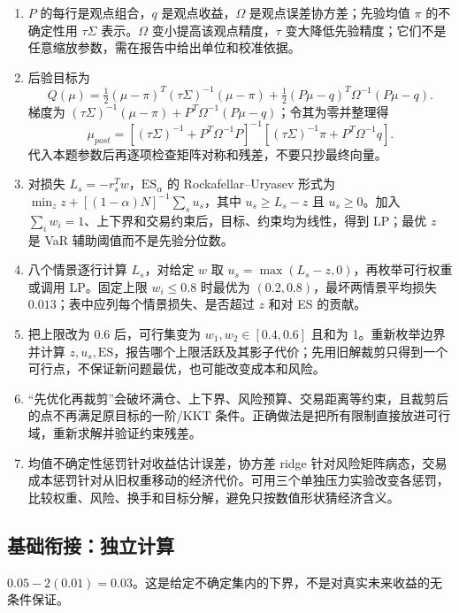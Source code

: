 
\begin{enumerate}[leftmargin=*]
  \item $P$ 的每行是观点组合，$q$ 是观点收益，$\Omega$ 是观点误差协方差；先验均值 $\pi$ 的不确定性用 $\tau\Sigma$ 表示。$\Omega$ 变小提高该观点精度，$\tau$ 变大降低先验精度；它们不是任意缩放参数，需在报告中给出单位和校准依据。
  \item 后验目标为
  \[
  Q(\mu)=\tfrac12(\mu-\pi)^T(\tau\Sigma)^{-1}(\mu-\pi)+
  \tfrac12(P\mu-q)^T\Omega^{-1}(P\mu-q).
  \]
  梯度为 $(\tau\Sigma)^{-1}(\mu-\pi)+P^T\Omega^{-1}(P\mu-q)$；令其为零并整理得
  \[
  \mu_{post}=\left[(\tau\Sigma)^{-1}+P^T\Omega^{-1}P\right]^{-1}
  \left[(\tau\Sigma)^{-1}\pi+P^T\Omega^{-1}q\right].
  \]
  代入本题参数后再逐项检查矩阵对称和残差，不要只抄最终向量。
  \item 对损失 $L_s=-r_s^Tw$，$\mathrm{ES}_\alpha$ 的 Rockafellar--Uryasev 形式为 $\min_z z+[(1-\alpha)N]^{-1}\sum_su_s$，其中 $u_s\ge L_s-z$ 且 $u_s\ge0$。加入 $\sum_iw_i=1$、上下界和交易约束后，目标、约束均为线性，得到 LP；最优 $z$ 是 VaR 辅助阈值而不是先验分位数。
  \item 八个情景逐行计算 $L_s$，对给定 $w$ 取 $u_s=\max(L_s-z,0)$，再枚举可行权重或调用 LP。固定上限 $w_i\le0.8$ 时最优为 $(0.2,0.8)$，最坏两情景平均损失 $0.013$；表中应列每个情景损失、是否超过 $z$ 和对 ES 的贡献。
  \item 把上限改为 $0.6$ 后，可行集变为 $w_1,w_2\in[0.4,0.6]$ 且和为 1。重新枚举边界并计算 $z,u_s,\mathrm{ES}$，报告哪个上限活跃及其影子代价；先用旧解裁剪只得到一个可行点，不保证新问题最优，也可能改变成本和风险。
  \item “先优化再裁剪”会破坏满仓、上下界、风险预算、交易距离等约束，且裁剪后的点不再满足原目标的一阶/KKT 条件。正确做法是把所有限制直接放进可行域，重新求解并验证约束残差。
  \item 均值不确定性惩罚针对收益估计误差，协方差 ridge 针对风险矩阵病态，交易成本惩罚针对从旧权重移动的经济代价。可用三个单独压力实验改变各惩罚，比较权重、风险、换手和目标分解，避免只按数值形状猜经济含义。
\end{enumerate}

\subsection*{基础衔接：独立计算}
$0.05-2(0.01)=0.03$。这是给定不确定集内的下界，不是对真实未来收益的无条件保证。


\MFQMappedPortfolioOptimizationSolutions
